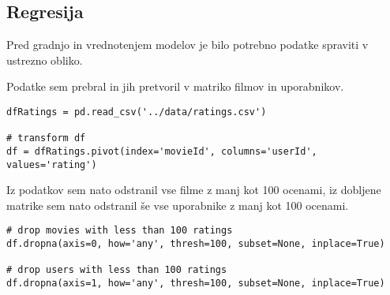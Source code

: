 \documentclass[a4paper,11pt]{article}
\begin{document}
%
%
%
%

\subsection{Regresija}
Pred gradnjo in vrednotenjem modelov je bilo potrebno podatke spraviti v
ustrezno obliko.

Podatke sem prebral in jih pretvoril v matriko filmov in uporabnikov.

\begin{lstlisting}
dfRatings = pd.read_csv('../data/ratings.csv')

# transform df
df = dfRatings.pivot(index='movieId', columns='userId', values='rating')
\end{lstlisting}

Iz podatkov sem nato odstranil vse filme z manj kot 100 ocenami, iz dobljene
matrike sem nato odstranil še vse uporabnike z manj kot 100 ocenami.

\begin{lstlisting}
# drop movies with less than 100 ratings
df.dropna(axis=0, how='any', thresh=100, subset=None, inplace=True)

# drop users with less than 100 ratings
df.dropna(axis=1, how='any', thresh=100, subset=None, inplace=True)
\end{lstlisting}
\end{document}
